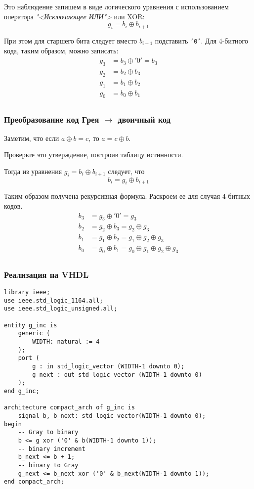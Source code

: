 Это наблюдение запишем в виде логического уравнения с использованием оператора \emph{"<Исключающее ИЛИ">} или XOR:
\[
g_i = b_i \oplus b_{i+1}
\]

При этом для старшего бита следует вместо $b_{i+1}$  подставить \texttt{'0'}. Для 4-битного кода, таким образом, можно записать:
\[ \begin{aligned}
g_3 &= b_3 \oplus '0' = b_3 \\
g_2 &= b_2 \oplus b_3       \\
g_1 &= b_1 \oplus b_2       \\
g_0 &= b_0 \oplus b_1       \\
\end{aligned} \]

\subsubsection{Преобразование код Грея $\rightarrow$ двоичный код}

Заметим, что если $a \oplus b = c$, то $a = c \oplus b$.

 Проверьте это утверждение, построив таблицу истинности.

Тогда из уравнения $g_i = b_i \oplus b_{i+1}$ следует, что
\[
b_i = g_i \oplus b_{i+1}
\]

Таким образом получена рекурсивная формула. Раскроем ее для случая 4-битных кодов.
\[ \begin{aligned}
b_3 &= g_3 \oplus '0' = g_3                                     \\
b_2 &= g_2 \oplus b_3 = g_2 \oplus g_3                          \\
b_1 &= g_1 \oplus b_2 = g_1 \oplus g_2 \oplus g_3               \\
b_0 &= g_0 \oplus b_1 = g_0 \oplus g_1 \oplus g_2 \oplus g_3    \\
\end{aligned} \]

\subsubsection{Реализация на VHDL}
\begin{Code}
\begin{lstlisting}
library ieee;
use ieee.std_logic_1164.all;
use ieee.std_logic_unsigned.all;

entity g_inc is
    generic (
        WIDTH: natural := 4
    );
    port ( 
        g : in std_logic_vector (WIDTH-1 downto 0);
        g_next : out std_logic_vector (WIDTH-1 downto 0)
    );
end g_inc;

architecture compact_arch of g_inc is
    signal b, b_next: std_logic_vector(WIDTH-1 downto 0);
begin
    -- Gray to binary
    b <= g xor ('0' & b(WIDTH-1 downto 1));
    -- binary increment
    b_next <= b + 1;
    -- binary to Gray
    g_next <= b_next xor ('0' & b_next(WIDTH-1 downto 1));
end compact_arch;
\end{lstlisting}
\end{Code}

